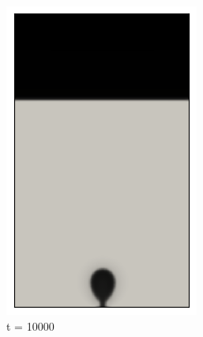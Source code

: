 \begin{figure}[H]
\begin{subfigure}{0.25\textwidth}
		\includegraphics[width=\linewidth]{figs/cap4/cuda_bb_760_d10}
		\caption{t = 10000}
		\label{fig:2}
	\end{subfigure}\hfil 
	\begin{subfigure}{0.25\textwidth}

\end{subfigure}
\end{figure}
